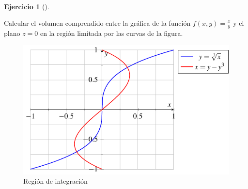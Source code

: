 \documentclass[
  spanish,
  a4paper,
]{scrreport}
\theoremstyle{definition}
\newtheorem{exercise}{Ejercicio}[chapter]
\theoremstyle{remark}
\begin{document}
\begin{exercise}[]\protect\hypertarget{exr-6}{}\label{exr-6}

Calcular el volumen comprendido entre la gráfica de la función
\(f(x,y)=\frac{x}{y}\) y el plano \(z=0\) en la región limitada por las
curvas de la figura.

\begin{figure}[H]

{\centering \includegraphics[width=12cm,height=\textheight,keepaspectratio]{img/examen-2024-12-20/region-integracion.pdf}

}

\caption{Región de integración}

\end{figure}%

\end{exercise}
\end{document}

